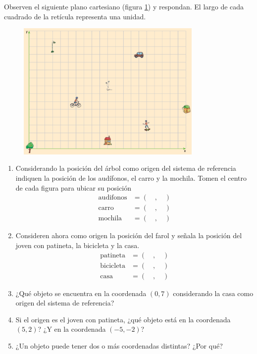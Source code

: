 \documentclass[11pt]{book}
\begin{document}
Observen el siguiente plano cartesiano (figura \ref{fig:plano01})  y respondan.
El largo de cada cuadrado de la retícula representa una unidad.
\begin{figure}[H]
  \centering
  \includegraphics[width=0.8\textwidth]{plano01.png}
  \label{fig:plano01}
\end{figure}
\begin{enumerate}
  \item Considerando la posición del árbol como origen del sistema de referencia indiquen la posición
        de los audífonos, el carro y la mochila. Tomen el centro de cada figura para ubicar su posición
        \begin{align*}
          \text{audifonos} & = ( \quad, \quad ) \\
          \text{carro}     & = ( \quad, \quad ) \\
          \text{mochila}   & = ( \quad, \quad )
        \end{align*}
  \item Consideren ahora como origen la posición del farol y señala la posición del joven con patineta,
        la bicicleta y la casa.
        \begin{align*}
          \text{patineta}  & = ( \quad, \quad ) \\
          \text{bicicleta} & = ( \quad, \quad ) \\
          \text{casa}      & = ( \quad, \quad )
        \end{align*}
  \item ¿Qué objeto se encuentra en la coordenada $(0, 7)$ considerando la casa como origen del sistema de
        referencia?
  \item Si el origen es el joven con patineta, ¿qué objeto está en la coordenada $(5, 2)$? ¿Y en la
        coordenada $(-5, -2)$?
  \item ¿Un objeto puede tener dos o más coordenadas distintas? ¿Por qué?


\end{enumerate}
\end{document}
